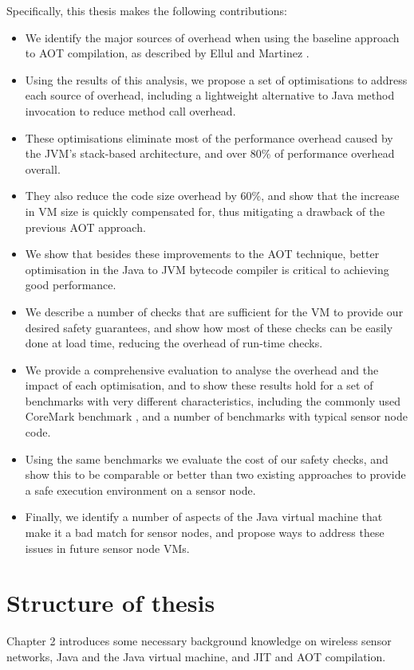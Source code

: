 Specifically, this thesis makes the following contributions:
\begin{itemize}
	\item We identify the major sources of overhead when using the baseline approach to AOT compilation, as described by Ellul and Martinez \cite{Ellul:2010iw, Ellul:2012thesis}.
	\item Using the results of this analysis, we propose a set of optimisations to address each source of overhead, including a lightweight alternative to Java method invocation to reduce method call overhead.
	\item These optimisations eliminate most of the performance overhead caused by the JVM's stack-based architecture, and over 80\% of performance overhead overall.
	\item They also reduce the code size overhead by 60\%, and show that the increase in VM size is quickly compensated for, thus mitigating a drawback of the previous AOT approach.
	\item We show that besides these improvements to the AOT technique, better optimisation in the Java to JVM bytecode compiler is critical to achieving good performance.
	\item We describe a number of checks that are sufficient for the VM to provide our desired safety guarantees, and show how most of these checks can be easily done at load time, reducing the overhead of run-time checks.
	\item We provide a comprehensive evaluation to analyse the overhead and the impact of each optimisation, and to show these results hold for a set of benchmarks with very different characteristics, including the commonly used CoreMark benchmark \cite{coremark}, and a number of benchmarks with typical sensor node code.
	\item Using the same benchmarks we evaluate the cost of our safety checks, and show this to be comparable or better than two existing approaches to provide a safe execution environment on a sensor node.
	\item Finally, we identify a number of aspects of the Java virtual machine that make it a bad match for sensor nodes, and propose ways to address these issues in future sensor node VMs.
\end{itemize}

\section{Structure of thesis}
Chapter 2 introduces some necessary background knowledge on wireless sensor networks, Java and the Java virtual machine, and JIT and AOT compilation.

